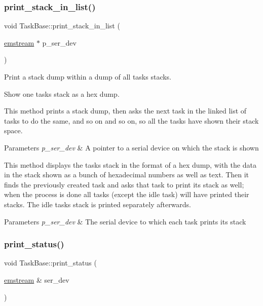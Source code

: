 \subsubsection{\texorpdfstring{print\+\_\+stack\+\_\+in\+\_\+list()}{print\_stack\_in\_list()}}
{\footnotesize\ttfamily void Task\+Base\+::print\+\_\+stack\+\_\+in\+\_\+list (\begin{DoxyParamCaption}\item[{\mbox{\hyperlink{classemstream}{emstream}} $\ast$}]{p\+\_\+ser\+\_\+dev }\end{DoxyParamCaption})}



Print a stack dump within a dump of all tasks\textquotesingle{} stacks. 

Show one task\textquotesingle{}s stack as a hex dump.

This method prints a stack dump, then asks the next task in the linked list of tasks to do the same, and so on and so on, so all the tasks have shown their stack space. 
\begin{DoxyParams}{Parameters}
{\em p\+\_\+ser\+\_\+dev} & A pointer to a serial device on which the stack is shown\\
\hline
\end{DoxyParams}
This method displays the task\textquotesingle{}s stack in the format of a hex dump, with the data in the stack shown as a bunch of hexadecimal numbers as well as text. Then it finds the previously created task and asks that task to print its stack as well; when the process is done all tasks (except the idle task) will have printed their stacks. The idle task\textquotesingle{}s stack is printed separately afterwards. 
\begin{DoxyParams}{Parameters}
{\em p\+\_\+ser\+\_\+dev} & The serial device to which each task prints its stack \\
\hline
\end{DoxyParams}
\mbox{\label{class_task_base_aea504e1e3d38a7e8e8c65c4284d4a560}} 
\subsubsection{\texorpdfstring{print\+\_\+status()}{print\_status()}}
{\footnotesize\ttfamily void Task\+Base\+::print\+\_\+status (\begin{DoxyParamCaption}\item[{\mbox{\hyperlink{classemstream}{emstream}} \&}]{ser\+\_\+dev }\end{DoxyParamCaption})\hspace{0.3cm}{\ttfamily [virtual]}}

